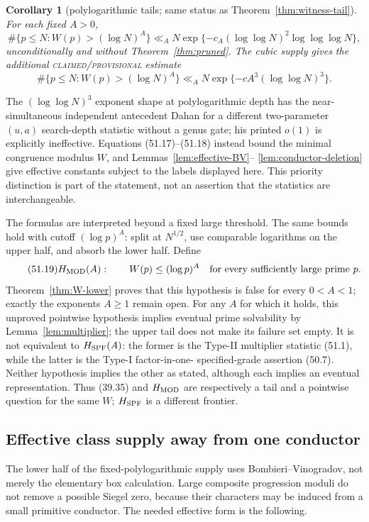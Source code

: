 \documentclass[10pt,reqno]{amsart}
\newtheorem{corollary}[theorem]{Corollary}
\theoremstyle{definition}
\newcommand{\1}{\mathbf 1}
\begin{document}
\begin{corollary}[polylogarithmic tails; same status as
Theorem~\ref{thm:witness-tail}]\label{cor:witness-polylog}
For each fixed $A>0$,
\begin{equation}\tag{51.17}
 \#\{p\leq N:W(p)>(\log N)^A\}
 \ll_A N\exp\{-c_A(\log\log N)^2\log\log\log N\},
\end{equation}
unconditionally and without Theorem~\ref{thm:pruned}.  The cubic supply
gives the additional \textsc{claimed/provisional} estimate
\begin{equation}\tag{51.18}
 \#\{p\leq N:W(p)>(\log N)^A\}
 \ll_A N\exp\{-cA^3(\log\log N)^3\}.
\end{equation}
\end{corollary}
The $(\log\log N)^3$ exponent shape at polylogarithmic depth has the
near-simultaneous independent antecedent Dahan
\cite[Theorem~4.17]{Dahan} for a different two-parameter $(u,a)$
search-depth statistic without a genus gate; his printed $o(1)$ is
explicitly ineffective.  Equations (51.17)--(51.18) instead bound the
minimal congruence modulus $W$, and Lemmas~\ref{lem:effective-BV}--
\ref{lem:conductor-deletion} give effective constants subject to the
labels displayed here.  This priority distinction is part of the statement,
not an assertion that the statistics are interchangeable.

The formulas are interpreted beyond a fixed large threshold.  The same
bounds hold with cutoff $(\log p)^A$: split at $N^{1/2}$, use comparable
logarithms on the upper half, and absorb the lower half.  Define
\begin{equation}\tag{51.19}
 H_{\rm MOD}(A):\qquad W(p)\leq(\log p)^A
                 \quad\hbox{for every sufficiently large prime }p.
\end{equation}
Theorem~\ref{thm:W-lower} proves that this hypothesis is false for every
$0<A<1$; exactly the exponents $A\geq1$ remain open.  For any $A$ for which
it holds, this unproved pointwise hypothesis implies eventual prime
solvability by Lemma~\ref{lem:multiplier}; the upper tail does not make its
failure set empty.  It is not equivalent to $H_{\rm SPF}(A)$: the former is the Type-II
multiplier statistic (51.1), while the latter is the Type-I factor-in-one-
specified-grade assertion (50.7).  Neither hypothesis implies the other as
stated, although each implies an eventual representation.  Thus (39.35)
and $H_{\rm MOD}$ are respectively a tail and a pointwise question for the
same $W$; $H_{\rm SPF}$ is a different frontier.

\subsection{Effective class supply away from one conductor}
The lower half of the fixed-polylogarithmic supply uses
Bombieri--Vinogradov, not merely the elementary box calculation.  Large
composite progression moduli do not remove a possible Siegel zero, because
their characters may be induced from a small primitive conductor.  The
needed effective form is the following.
\end{document}
